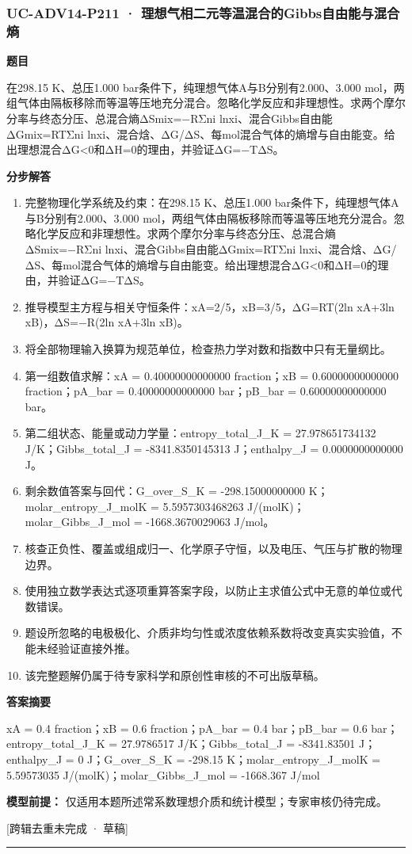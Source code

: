 \documentclass[UTF8,11pt,a4paper]{ctexart}
\begin{document}
\subsubsection*{UC-ADV14-P211 · 理想气相二元等温混合的Gibbs自由能与混合熵}
\noindent\textbf{题目}\par
在298.15 K、总压1.000 bar条件下，纯理想气体A与B分别有2.000、3.000 mol，两组气体由隔板移除而等温等压地充分混合。忽略化学反应和非理想性。求两个摩尔分率与终态分压、总混合熵ΔSmix=−RΣni lnxi、混合Gibbs自由能ΔGmix=RTΣni lnxi、混合焓、ΔG/ΔS、每mol混合气体的熵增与自由能变。给出理想混合ΔG<0和ΔH=0的理由，并验证ΔG=−TΔS。\par
\medskip\noindent\textbf{分步解答}
\begin{enumerate}
\item 完整物理化学系统及约束：在298.15 K、总压1.000 bar条件下，纯理想气体A与B分别有2.000、3.000 mol，两组气体由隔板移除而等温等压地充分混合。忽略化学反应和非理想性。求两个摩尔分率与终态分压、总混合熵ΔSmix=−RΣni lnxi、混合Gibbs自由能ΔGmix=RTΣni lnxi、混合焓、ΔG/ΔS、每mol混合气体的熵增与自由能变。给出理想混合ΔG<0和ΔH=0的理由，并验证ΔG=−TΔS。
\item 推导模型主方程与相关守恒条件：xA=2/5，xB=3/5，ΔG=RT(2ln xA+3ln xB)，ΔS=−R(2ln xA+3ln xB)。
\item 将全部物理输入换算为规范单位，检查热力学对数和指数中只有无量纲比。
\item 第一组数值求解：xA = 0.40000000000000 fraction；xB = 0.60000000000000 fraction；pA\_bar = 0.40000000000000 bar；pB\_bar = 0.60000000000000 bar。
\item 第二组状态、能量或动力学量：entropy\_total\_J\_K = 27.978651734132 J/K；Gibbs\_total\_J = -8341.8350145313 J；enthalpy\_J = 0.0000000000000 J。
\item 剩余数值答案与回代：G\_over\_S\_K = -298.15000000000 K；molar\_entropy\_J\_molK = 5.5957303468263 J/(molK)；molar\_Gibbs\_J\_mol = -1668.3670029063 J/mol。
\item 核查正负性、覆盖或组成归一、化学原子守恒，以及电压、气压与扩散的物理边界。
\item 使用独立数学表达式逐项重算答案字段，以防止主求值公式中无意的单位或代数错误。
\item 题设所忽略的电极极化、介质非均匀性或浓度依赖系数将改变真实实验值，不能未经验证直接外推。
\item 该完整题解仍属于待专家科学和原创性审核的不可出版草稿。
\end{enumerate}
\noindent\textbf{答案摘要}\par
xA = 0.4 fraction；xB = 0.6 fraction；pA\_bar = 0.4 bar；pB\_bar = 0.6 bar；entropy\_total\_J\_K = 27.9786517 J/K；Gibbs\_total\_J = -8341.83501 J；enthalpy\_J = 0 J；G\_over\_S\_K = -298.15 K；molar\_entropy\_J\_molK = 5.59573035 J/(molK)；molar\_Gibbs\_J\_mol = -1668.367 J/mol\par
\noindent\textbf{模型前提：}
仅适用本题所述常系数理想介质和统计模型；专家审核仍待完成。\par
\noindent\textcolor{red!65!black}{[跨辑去重未完成 · 草稿]} \par
\medskip\hrule\medskip
{}
\end{document}
